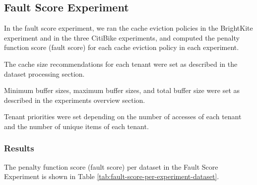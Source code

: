 \newpage

\begin{table}[ht]
    \centering
    \small
    \caption{Penalty function score (fault score) per cache size for the CitiBike dataset (first experiment)}
    \label{tab:fault-score-per-buffer-size-citibike}
\end{table}

\begin{table}[ht]
    \centering
    \small
    \caption{Penalty function score (fault score) per cache size for the CitiBike dataset (second experiment)}
    \label{tab:fault-score-per-buffer-size-citibike-2}
\end{table}

\begin{table}[ht]
    \centering
    \small
    \caption{Penalty function score (fault score) per cache size for the CitiBike dataset (third experiment)}
    \label{tab:fault-score-per-buffer-size-citibike-3}
\end{table}

\subsection{Fault Score Experiment}

In the fault score experiment, we ran the cache eviction policies in the BrightKite experiment 
and in the three CitiBike experiments, and computed the penalty function score (fault score) 
for each cache eviction policy in each experiment.

The cache size recommendations for each tenant were set as described in the dataset processing 
section.

Minimum buffer sizes, maximum buffer sizes, and total buffer size were set as described in 
the experiments overview section.

Tenant priorities were set depending on the number of accesses of each tenant and the number of
unique items of each tenant.

\subsubsection*{Results}

The penalty function score (fault score) per dataset in the Fault Score Experiment is shown
in Table \ref{tab:fault-score-per-experiment-dataset}.

